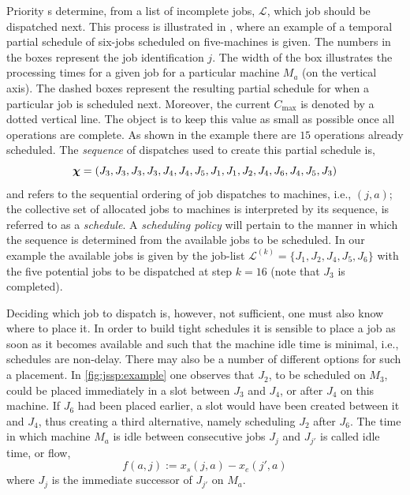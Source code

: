\documentclass[smallextended]{svjour3}
\begin{document}
Priority \dr s determine, from a list of incomplete jobs, 
$\mathcal{L}$, which job should be dispatched next. This process is illustrated 
in , where an example of 
a temporal partial schedule of six-jobs scheduled on five-machines is given. 
The numbers in the boxes represent the job identification $j$. 
The width of the box illustrates the processing times for a given job for a 
particular machine $M_a$ (on the vertical axis). 
The dashed boxes represent the resulting partial schedule for when a particular 
job is scheduled next. 
Moreover, the current $C_{\max}$ is denoted by a dotted vertical line. 
The object is to keep this value as small as possible once all operations are 
complete. As shown in the example there are $15$ operations already scheduled. 
The \textit{sequence} of dispatches used to create this partial schedule is,
\begin{equation}
	\bm \chi=\left(J_3,J_3,J_3,J_3,J_4,J_4,J_5,J_1,J_1,J_2,J_4,J_6,J_4,J_5,J_3\right)
\end{equation}
and refers to the sequential ordering of job dispatches to machines, i.e., $(j,a)$; 
the collective set of allocated jobs to machines is interpreted by its 
sequence, is referred to as a \emph{schedule}.
A \emph{scheduling policy} will pertain to the manner in which 
the sequence is determined from the available jobs to be scheduled. 
In our example the available jobs is given by the job-list
$\mathcal{L}^{(k)}=\{J_1,J_2,J_4,J_5,J_6\}$ with the five potential jobs 
to be dispatched at step $k=16$ (note that $J_3$ is completed).

Deciding which job to dispatch is, however, not sufficient, one must also know 
where to place it. In order to build tight schedules it is sensible to place a 
job as soon as it becomes available and such that the machine idle time is 
minimal, i.e., schedules are non-delay. 
There may also be a number of different options for such a placement. 
In \cref{fig:jssp:example} one observes that $J_2$, to be scheduled on $M_3$, 
could be placed immediately in a slot between $J_3$ and $J_4$, or after $J_4$ 
on this machine. 
If $J_6$ had been placed earlier, a slot would have been created between it and 
$J_4$, thus creating a third alternative, namely scheduling $J_2$ after $J_6$. 
The time in which machine $M_a$ is idle between consecutive jobs $J_j$ and 
$J_{j'}$ is called idle time, or flow, 
\begin{equation} 
f(a,j):=x_s(j,a)-x_e(j',a) \label{eq:slack}
\end{equation}
where $J_j$ is the immediate successor of $J_{j'}$ on $M_a$. 
\end{document}
